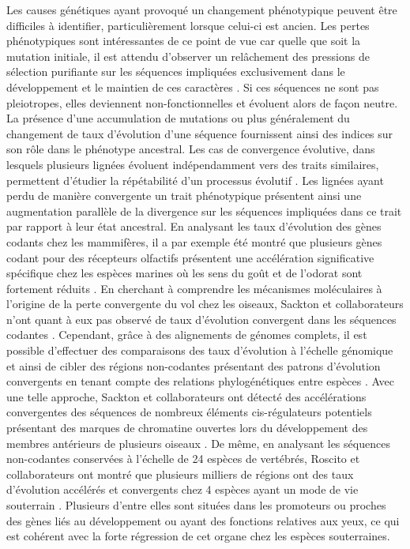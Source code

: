 Les causes génétiques ayant provoqué un changement phénotypique peuvent être difficiles à identifier, particulièrement lorsque celui-ci est ancien. Les pertes phénotypiques sont intéressantes de ce point de vue car quelle que soit la mutation initiale, il est attendu d’observer un relâchement des pressions de sélection purifiante sur les séquences impliquées exclusivement dans le développement et le maintien de ces caractères \citep{hiller_forward_2012, roscito_phenotype_2018}. Si ces séquences ne sont pas \glspl{pleiotrope}, elles deviennent non-fonctionnelles et évoluent alors de façon neutre. La présence d’une accumulation de mutations ou plus généralement du changement de taux d’évolution d'une séquence fournissent ainsi des indices sur son rôle dans le phénotype ancestral. Les cas de convergence évolutive, dans lesquels plusieurs lignées évoluent indépendamment vers des traits similaires, permettent d’étudier la répétabilité d’un processus évolutif \citep{sackton_convergent_2019}. Les lignées ayant perdu de manière convergente un trait phénotypique présentent ainsi une augmentation parallèle de la divergence sur les séquences impliquées dans ce trait par rapport à leur état ancestral. En analysant les taux d’évolution des gènes codants chez les mammifères, il a par exemple été montré que plusieurs gènes codant pour des récepteurs olfactifs présentent une accélération significative spécifique chez les espèces marines où les sens du goût et de l’odorat sont fortement réduits \citep{chikina_hundreds_2016}. En cherchant à comprendre les mécanismes moléculaires à l’origine de la perte convergente du vol chez les oiseaux, Sackton et collaborateurs n’ont quant à eux pas observé de taux d'évolution convergent dans les séquences codantes \citep{sackton_convergent_2019}. Cependant, grâce à des alignements de génomes complets, il est possible d’effectuer des comparaisons des taux d’évolution à l’échelle génomique et ainsi de cibler des régions non-codantes présentant des patrons d’évolution convergents en tenant compte des relations phylogénétiques entre espèces \citep{hiller_forward_2012,prudent_controlling_2016, partha_robust_2019}. Avec une telle approche, Sackton et collaborateurs ont détecté des accélérations convergentes des séquences de nombreux éléments \gls{cis}-régulateurs potentiels présentant des marques de chromatine ouvertes lors du développement des membres antérieurs de plusieurs oiseaux \citep{sackton_convergent_2019-1}. De même, en analysant les séquences non-codantes conservées à l’échelle de 24 espèces de vertébrés, Roscito et collaborateurs ont montré que plusieurs milliers de régions ont des taux d’évolution accélérés et convergents chez 4 espèces ayant un mode de vie souterrain \citep{roscito_phenotype_2018}. Plusieurs d’entre elles sont situées dans les promoteurs ou proches des gènes liés au développement ou ayant des fonctions relatives aux yeux, ce qui est cohérent avec la forte régression de cet organe chez les espèces souterraines.\\

